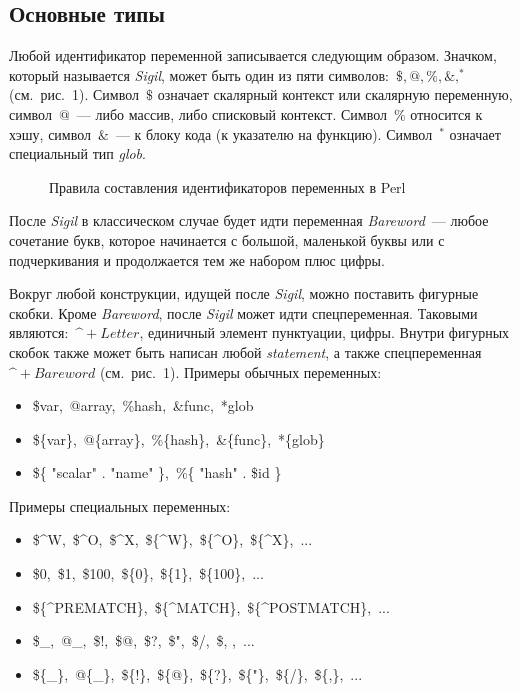 \subsection{Основные типы}
Любой идентификатор переменной записывается следующим образом.
Значком, который называется \textit{Sigil}, может быть один из пяти символов:~$\$, @, \%, \&, ^{\ast}$ (см.~рис.~1).
Символ~$\$$ означает скалярный контекст или скалярную переменную, символ~$@$~--- либо массив, либо списковый контекст.
Символ~$\%$ относится к хэшу, символ~$\&$~--- к блоку кода (к указателю на функцию).
Символ~$^{\ast}$ означает специальный тип \textit{glob}.

\begin{figure}[h!]\center
	
	\caption{Правила составления идентификаторов переменных в Perl}
\end{figure}

После \textit{Sigil} в классическом случае будет идти переменная \textit{Bareword}~--- любое сочетание букв, которое начинается с большой, маленькой буквы или с подчеркивания и продолжается тем же набором плюс цифры.

Вокруг любой конструкции, идущей после \textit{Sigil}, можно поставить фигурные скобки.
Кроме \textit{Bareword}, после \textit{Sigil} может идти спецпеременная.
Таковыми являются:~$\^+ Letter$, единичный элемент пунктуации, цифры.
Внутри фигурных скобок также может быть написан любой \textit{statement}, а также спецпеременная~$\^+Bareword$ (см.~рис.~1).
Примеры обычных переменных:
\begin{itemize}[noitemsep]
	\item \$var, @array, \%hash, \&func, *glob
	\item \$\{var\}, @\{array\}, \%\{hash\}, \&\{func\}, *\{glob\}
	\item \$\{  "scalar"  .  "name"  \}, \%\{  "hash" . \$id  \}
\end{itemize}

Примеры специальных переменных:
\begin{itemize}[noitemsep]
	\item \$\textasciicircum W, \$\textasciicircum O, \$\textasciicircum X, \$\{\textasciicircum W\}, \$\{\textasciicircum O\}, \$\{\textasciicircum X\}, ...
	
	\item \$0, \$1, \$100, \$\{0\}, \$\{1\}, \$\{100\}, ...
	
	\item \$\{\textasciicircum PREMATCH\}, \$\{\textasciicircum MATCH\}, \$\{\textasciicircum POSTMATCH\}, ...
	
	\item \$\_, @\_, \$!, \$@, \$?, \$", \$/, \$, , ...
	
	\item \$\{\_\}, @\{\_\}, \$\{!\}, \$\{@\}, \$\{?\}, \$\{"\}, \$\{/\}, \$\{,\}, ...
\end{itemize}

